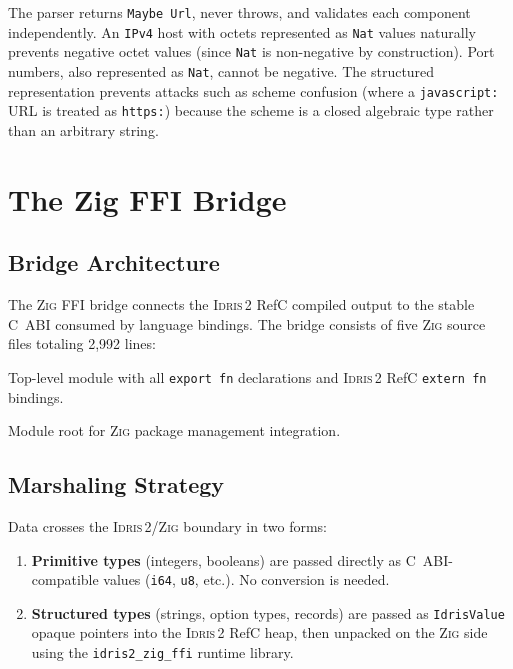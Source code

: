 \documentclass[11pt,a4paper]{article}
\newcommand{\idris}{\textsc{Idris\,2}}
\newcommand{\zig}{\textsc{Zig}}
\newcommand{\code}[1]{\texttt{#1}}
\begin{document}
The parser returns \code{Maybe Url}, never throws, and validates each
component independently. An \code{IPv4} host with octets represented as
\code{Nat} values naturally prevents negative octet values (since
\code{Nat} is non-negative by construction). Port numbers, also
represented as \code{Nat}, cannot be negative. The structured
representation prevents attacks such as scheme confusion (where a
\code{javascript:} URL is treated as \code{https:}) because the scheme
is a closed algebraic type rather than an arbitrary string.


\section{The Zig FFI Bridge}
\label{sec:ffi}

\subsection{Bridge Architecture}

The \zig{} FFI bridge connects the \idris{} RefC compiled output to the
stable C~ABI consumed by language bindings. The bridge consists of five
\zig{} source files totaling 2,992 lines:

\begin{description}[nosep]
  \item[\code{main.zig}] Top-level module with all \code{export fn}
    declarations and \idris{} RefC \code{extern fn} bindings.
  \item[\code{root.zig}] Module root for \zig{} package management
    integration.
\end{description}

\subsection{Marshaling Strategy}

Data crosses the \idris{}/\zig{} boundary in two forms:

\begin{enumerate}[nosep]
  \item \textbf{Primitive types} (integers, booleans) are passed directly
    as C~ABI-compatible values (\code{i64}, \code{u8}, etc.). No conversion
    is needed.
  \item \textbf{Structured types} (strings, option types, records) are
    passed as \code{IdrisValue} opaque pointers into the \idris{} RefC
    heap, then unpacked on the \zig{} side using the
    \code{idris2\_zig\_ffi} runtime library.
\end{enumerate}
\end{document}
